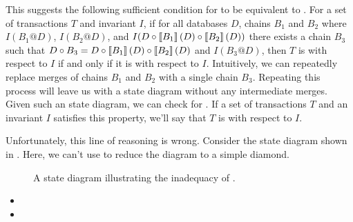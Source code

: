 This suggests the following sufficient condition for \liconfluence{} to be
equivalent to \iconfluence{}. For a set of transactions $T$ and invariant $I$,
if for all databases $D$, chains $B_1$ and $B_2$ where $I(B_1@D)$, $I(B_2@D)$,
and $I(D \circ \left\llbracket B_1\right\rrbracket(D) \circ \left\llbracket B_2\right\rrbracket(D))$ there exists a chain
$B_3$ such that $D \circ B_3 = D \circ \left\llbracket B_1\right\rrbracket(D) \circ \left\llbracket B_2\right\rrbracket(D)$
and $I(B_3@D)$, then $T$ is \liconfluent{} with respect to $I$ if and only if
it is \iconfluent{} with respect to $I$. Intuitively, we can repeatedly replace
merges of chains $B_1$ and $B_2$ with a single chain $B_3$. Repeating this
process will leave us with a state diagram without any intermediate merges.
Given such an state diagram, we can check for \liconfluence{}. If a set of
transactions $T$ and an invariant $I$ satisfies this property, we'll say that
$T$ is \ireplayable{} with respect to $I$.

Unfortunately, this line of reasoning is wrong. Consider the state diagram
shown in . Here, we can't use
\ireplayability{} to reduce the diagram to a simple diamond.

\begin{figure}[h]
  \centering
  \caption{A state diagram illustrating the inadequacy of \ireplayability{}.}
  \label{fig:ireplayability-notgoodenough}
\end{figure}

\begin{itemize}
  \item {}
  \item {}
\end{itemize}

%
